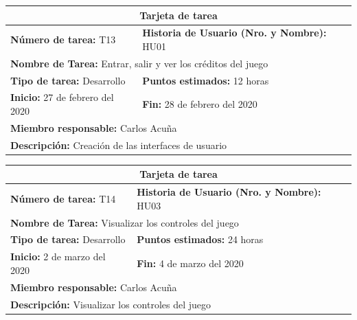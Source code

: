 \documentclass[a4paper, openright, 12pt]{report}
\begin{document}
\begin{longtable}{| p{6cm} | p{6cm} |}
\hline
\multicolumn{2}{|c|}{\textbf{Tarjeta de tarea}} \\
\hline
\textbf{Número de tarea:} T13 & \textbf{Historia de Usuario (Nro. y Nombre):} HU01\\
\hline
\multicolumn{2}{|p{12cm}|}{\textbf{Nombre de Tarea:} Entrar, salir y ver los
créditos del juego} \\ \hline
\textbf{Tipo de tarea:} Desarrollo & \textbf{Puntos estimados:} 12 horas  \\ \hline
\textbf{Inicio:} 27 de febrero del 2020 & \textbf{Fin:} 28 de febrero del 2020 \\ \hline
\multicolumn{2}{|p{12cm}|}{\textbf{Miembro responsable:} Carlos Acuña} \\ \hline
\multicolumn{2}{|p{12cm}|}{\textbf{Descripción:} Creación de las interfaces de usuario} \\ \hline
\end{longtable}

\begin{longtable}{| p{6cm} | p{6cm} |}
\hline
\multicolumn{2}{|c|}{\textbf{Tarjeta de tarea}} \\
\hline
\textbf{Número de tarea:} T14 & \textbf{Historia de Usuario (Nro. y Nombre):} HU03\\
\hline
\multicolumn{2}{|p{12cm}|}{\textbf{Nombre de Tarea:} Visualizar los controles del juego} \\ \hline
\textbf{Tipo de tarea:} Desarrollo & \textbf{Puntos estimados:} 24 horas  \\ \hline
\textbf{Inicio:} 2 de marzo del 2020 & \textbf{Fin:} 4 de marzo del 2020 \\ \hline
\multicolumn{2}{|p{12cm}|}{\textbf{Miembro responsable:} Carlos Acuña} \\ \hline
\multicolumn{2}{|p{12cm}|}{\textbf{Descripción:} Visualizar los controles del juego} \\ \hline
\end{longtable}
\end{document}
